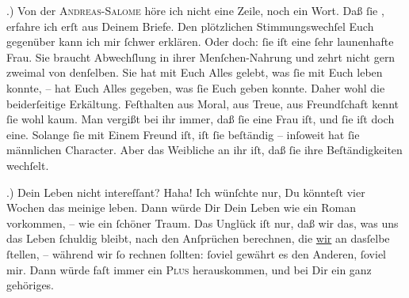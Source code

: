 .) Von der \textsc{Andreas-Salome} höre ich nicht eine Zeile, noch ein Wort. Daß ſie \label{K_L02774-8v}\label{K_L02774-8}, erfahre ich erſt aus Deinem Briefe. Den
               plötzlichen Stimmungswechſel Euch gegenüber kann ich mir ſchwer {\pb}erklären. Oder doch: ſie iſt eine ſehr launenhafte Frau. Sie
               braucht Abwechſlung in \strikeout{\textcolor{gray}{al}} ihrer Menſchen-Nahrung und zehrt nicht gern zweimal von denſelben. Sie hat mit
               Euch Alles gelebt, was ſie mit Euch leben konnte, – hat Euch Alles gegeben, was ſie
               Euch geben konnte. Daher wohl die beiderſeitige Erkältung. Feſthalten aus Moral, aus
               Treue, aus Freundſchaft {\pb}kennt ſie wohl kaum.  Man vergißt bei ihr immer, daß ſie eine Frau iſt, und ſie iſt doch eine.
               Solange ſie mit Einem Freund iſt, iſt ſie beſtändig – inſoweit hat ſie männlichen
               Character. Aber das Weibliche an ihr iſt, daß ſie ihre Beſtändigkeiten wechſelt.\pend
           
.) Dein Leben nicht intereſſant? Haha! Ich wünſchte nur, Du könnteſt vier Wochen
               das  meinige leben. {\pb}Dann würde  Dir Dein Leben wie ein Roman vorkommen, – wie ein ſchöner Traum. Das Unglück
               iſt nur, daß \strikeout{\textcolor{gray}{m}} wir das, was uns das Leben ſchuldig bleibt, nach den Anſprüchen berechnen, die
                  \uline{wir} an dasſelbe ſtellen, – während wir ſo rechnen
               ſollten: ſoviel gewährt es den Anderen, ſoviel mir. Dann würde faſt immer ein \textsc{Plus} herauskommen, und bei Dir ein ganz gehöriges.\pend
           
